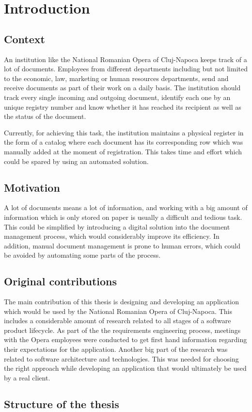 \chapter{Introduction}
\label{chapter:introduction}

\section{Context}
\label{section:context}

An institution like the National Romanian Opera of Cluj-Napoca keeps track of a lot of documents.
Employees from different departments including but not limited to the economic, law, marketing or human resources departments, send and receive documents as part of their work on a daily basis. The institution should track every single incoming and outgoing document, identify each one by an unique registry number and know whether it has reached its recipient as well as the status of the document.

Currently, for achieving this task, the institution maintains a physical register in the form of a catalog where each document has its corresponding row which was manually added at the moment of registration. This takes time and effort which could be spared by using an automated solution.

\section{Motivation}
\label{section:motivation}

A lot of documents means a lot of information, and working with a big amount of information which is only stored on paper is usually a difficult and tedious task. This could be simplified by introducing a digital solution into the document management process, which would considerably improve its efficiency. In addition, manual document management is prone to human errors, which could be avoided by automating some parts of the process.



\section{Original contributions}
\label{section:originalContributions}

The main contribution of this thesis is designing and developing an application which would be used by the National Romanian Opera of Cluj-Napoca. This includes a considerable amount of research related to all stages of a software product lifecycle. As part of the the requirements engineering process, meetings with the Opera employees were conducted to get first hand information regarding their expectations for the application. Another big part of the research was related to software architecture and technologies. This was needed for choosing the right approach while developing an application that would ultimately be used by a real client.

\section{Structure of the thesis}
\label{section:structureOfTheThesis}


